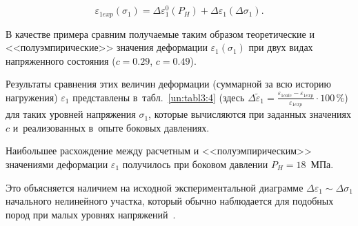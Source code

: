 $$

\varepsilon_{1exp}(\sigma_1 )=

\Delta\varepsilon^0_1 (P_H)+\Delta\varepsilon_1 (\Delta\sigma_1).$$ 

В качестве примера сравним получаемые таким образом теоретические и <<полуэмпирические>>  значения деформации $\varepsilon_1 (\sigma_1 )$ при двух видах напряженного состояния ($c=0.29$, $c=0.49$).   

Результаты сравнения этих величин деформации (суммарной за всю историю нагружения) $\varepsilon_1$ представлены в~табл.~\ref{un:tabl3:4} (здесь $\Delta \tilde \varepsilon_1 = \frac{\varepsilon_{1calc}-\varepsilon_{1exp}}{\varepsilon_{1exp}}\cdot 100\,\% $) для таких уровней напряжения $\sigma_1$, которые вычисляются при заданных значениях $c$ и~реализованных в~опыте боковых давлениях. 

Наибольшее расхождение между расчетным и <<полуэмпирическим>>  значениями деформации $\varepsilon_1$ получилось при боковом давлении $P_H=18$~МПа. 

Это объясняется наличием на исходной экспериментальной диаграмме  $\Delta\varepsilon_1 \sim \Delta\sigma_1 $  начального нелинейного участка, который обычно наблюдается для подобных пород при малых уровнях напряжений~\cite{ulg:bib:Stavrogin}.



